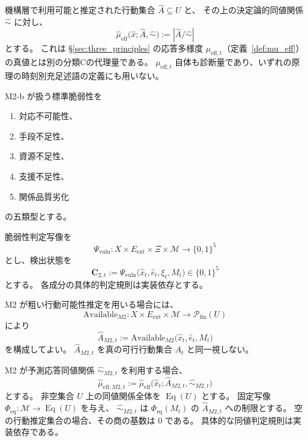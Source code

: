 \begin{definition}
\label{def:mech_mu_eff}
機構層で利用可能と推定された行動集合 $\hat A\subseteq U$ と、
その上の決定論的同値関係 $\hat\sim$ に対し、
\[
  \hat\mu_{\mathrm{eff}}
  \bigl(
    \hat x;\hat A,\hat\sim
  \bigr)
  :=
  |\hat A/\hat\sim|
\]
とする。
これは \S\ref{sec:three_principles} の応答多様度 $\mu_{\mathrm{eff},t}$（定義~\ref{def:mu_eff}）の真値とは別の分類Cの代理量である。
$\mu_{\mathrm{eff},t}$ 自体も診断量であり、いずれの原理の時刻別充足述語の定義にも用いない。
\end{definition}

\begin{definition}
\label{def:m2b_vuln}
M2-b が扱う標準脆弱性を
\begin{enumerate}
  \item 対応不可能性、
  \item 手段不足性、
  \item 資源不足性、
  \item 支援不足性、
  \item 関係品質劣化
\end{enumerate}
の五類型とする。

脆弱性判定写像を
\[
  \Psi_{\mathrm{vuln}}:
  X\times E_{\mathrm{ext}}\times\Xi\times\mathcal M
  \to\{0,1\}^{5}
\]
とし、検出状態を
\[
  \mathbf C_{2,t}
  :=
  \Psi_{\mathrm{vuln}}
  \bigl(
    \hat x_t,\hat e_t,\xi_t,M_t
  \bigr)
  \in\{0,1\}^{5}
\]
とする。
各成分の具体的判定規則は実装依存とする。
\end{definition}

M2 が粗い行動可能性推定を用いる場合には、
\[
  \mathrm{Available}_{M2}:
  X\times E_{\mathrm{ext}}\times\mathcal M
  \to\mathcal P_{\mathrm{fin}}(U)
\]
により
\[
  \hat A_{M2,t}
  :=
  \mathrm{Available}_{M2}
  \bigl(
    \hat x_t,\hat e_t,M_t
  \bigr)
\]
を構成してよい。
$\hat A_{M2,t}$ を真の可行行動集合 $A_t$ と同一視しない。

M2 が予測応答同値関係 $\hat\sim_{M2,t}$ を利用する場合、
\[
  \hat\mu_{\mathrm{eff},M2,t}
  :=
  \hat\mu_{\mathrm{eff}}
  \bigl(
    \hat x_t;
    \hat A_{M2,t},
    \hat\sim_{M2,t}
  \bigr)
\]
とする。
非空集合 $U$ 上の同値関係全体を $\operatorname{Eq}(U)$ とする。
固定写像 $\Phi_{\mathrm{eq}}:\mathcal M\to\operatorname{Eq}(U)$ を与え、
$\hat\sim_{M2,t}$ は $\Phi_{\mathrm{eq}}(M_t)$ の $\hat A_{M2,t}$ への制限とする。
空の行動推定集合の場合、その商の基数は $0$ である。
具体的な同値判定規則は実装依存である。

